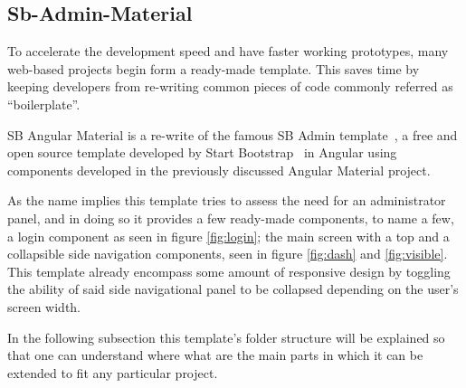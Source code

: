 \subsection{Sb-Admin-Material}
To accelerate the development speed and have faster working prototypes, many web-based projects begin form a ready-made template. This saves time by keeping developers from re-writing common pieces of code commonly referred as ``boilerplate''.

SB Angular Material is a re-write of the famous SB Admin template~\cite{angulartemplate}, a free and open source template developed by Start Bootstrap~\cite{sbadmin} in Angular using components developed in the previously discussed Angular Material project.

As the name implies this template tries to assess the need for an administrator panel, and in doing so it provides a few ready-made components, to name a few, a login component as seen in figure \ref{fig:login}; the main screen with a top and a collapsible side navigation components, seen in figure \ref{fig:dash} and \ref{fig:visible}. This template already encompass some amount of responsive design by toggling the ability of said side navigational panel to be collapsed depending on the user's screen width.

In the following subsection this template's folder structure will be explained so that one can understand where what are the main parts in which it can be extended to fit any particular project.

